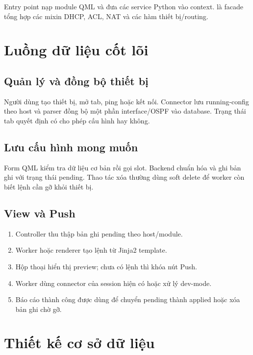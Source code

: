 Entry point  nạp module QML  và đưa các service Python vào context.  là facade tổng hợp các mixin DHCP, ACL, NAT và các hàm thiết bị/routing.

\section{Luồng dữ liệu cốt lõi}

\subsection{Quản lý và đồng bộ thiết bị}

Người dùng tạo thiết bị, mở tab, ping hoặc kết nối. Connector lưu running-config theo host và parser đồng bộ một phần interface/OSPF vào database. Trạng thái tab quyết định có cho phép cấu hình hay không.

\subsection{Lưu cấu hình mong muốn}

Form QML kiểm tra dữ liệu cơ bản rồi gọi slot. Backend chuẩn hóa và ghi bản ghi với trạng thái pending. Thao tác xóa thường dùng soft delete để worker còn biết lệnh cần gỡ khỏi thiết bị.

\subsection{View và Push}

\begin{enumerate}
  \item Controller thu thập bản ghi pending theo host/module.
  \item Worker hoặc renderer tạo lệnh từ Jinja2 template.
  \item Hộp thoại hiển thị preview; chưa có lệnh thì khóa nút Push.
  \item Worker dùng connector của session hiện có hoặc xử lý dev-mode.
  \item Báo cáo thành công được dùng để chuyển pending thành applied hoặc xóa bản ghi chờ gỡ.
\end{enumerate}

\section{Thiết kế cơ sở dữ liệu}

